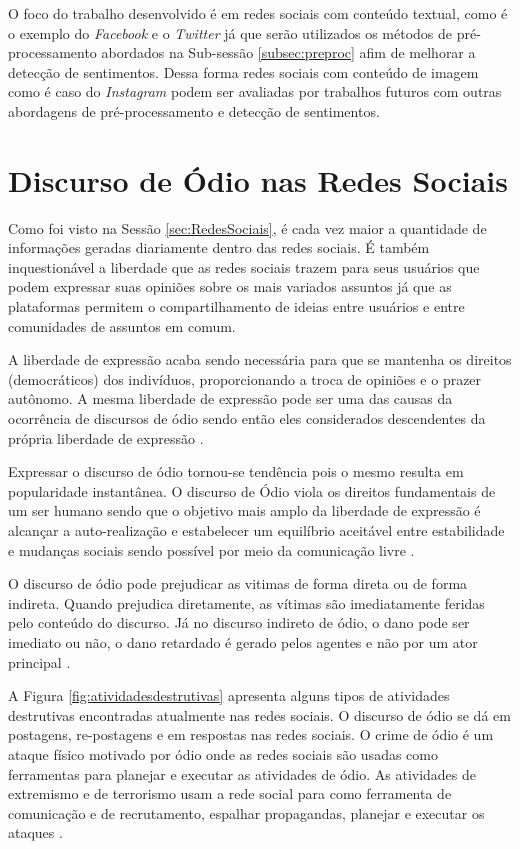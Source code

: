 O foco do trabalho desenvolvido é em redes sociais com conteúdo textual, como é o exemplo do \textit{Facebook} e o \textit{Twitter} já que serão utilizados os métodos de pré-processamento abordados na Sub-sessão \ref{subsec:preproc} afim de melhorar a detecção de sentimentos. Dessa forma redes sociais com conteúdo de imagem como é caso do \textit{Instagram} podem ser avaliadas por trabalhos futuros com outras abordagens de pré-processamento e detecção de sentimentos.

\section{Discurso de Ódio nas Redes Sociais}
Como foi visto na Sessão \ref{sec:RedesSociais}, é cada vez maior a quantidade de informações geradas diariamente dentro das redes sociais. É também inquestionável a liberdade que as redes sociais trazem para seus usuários que podem expressar suas opiniões sobre os mais variados assuntos já que as plataformas permitem o compartilhamento de ideias entre usuários e entre comunidades de assuntos em comum. 

A liberdade de expressão acaba sendo necessária para que se mantenha os direitos (democráticos) dos indivíduos, proporcionando a troca de opiniões e o prazer autônomo. A mesma liberdade de expressão pode ser uma das causas da ocorrência de discursos de ódio sendo então eles  considerados descendentes da própria liberdade de expressão \cite{Chetty2018}.

Expressar o discurso de ódio tornou-se tendência pois o mesmo resulta em popularidade instantânea. O discurso de Ódio viola os direitos fundamentais de um ser humano sendo que o objetivo mais amplo da liberdade de expressão é alcançar a auto-realização e estabelecer um equilíbrio aceitável entre estabilidade e mudanças sociais sendo possível por meio da comunicação livre \cite{Chetty2018}.

O discurso de ódio pode prejudicar as vitimas de forma direta ou de forma indireta. Quando prejudica diretamente, as vítimas são imediatamente feridas pelo conteúdo do discurso. Já no discurso indireto de ódio, o dano pode ser imediato ou não, o dano retardado é gerado pelos agentes e não por um ator principal \cite{Seglow2016}. 

A Figura \ref{fig:atividadesdestrutivas} apresenta alguns tipos de atividades destrutivas encontradas atualmente nas redes sociais. O discurso de ódio se dá em postagens, re-postagens e em respostas nas redes sociais. O crime de ódio é um ataque físico motivado por ódio onde as redes sociais são usadas como ferramentas para planejar e executar as atividades de ódio. As atividades de extremismo e de terrorismo usam a rede social para como ferramenta de comunicação e de recrutamento, espalhar propagandas, planejar e executar os ataques  \cite{Chetty2018}.

